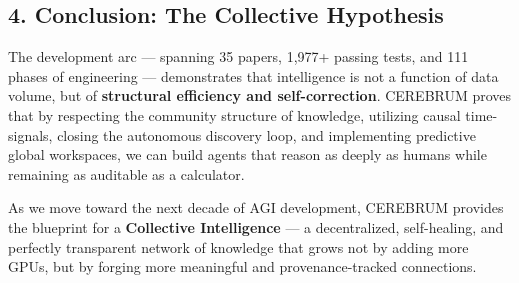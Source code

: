 \subsection*{4. Conclusion: The Collective Hypothesis}
The development arc --- spanning 35 papers, 1,977+ passing tests, and 111 phases of engineering --- demonstrates that intelligence is not a function of data volume, but of \textbf{structural efficiency and self-correction}. CEREBRUM proves that by respecting the community structure of knowledge, utilizing causal time-signals, closing the autonomous discovery loop, and implementing predictive global workspaces, we can build agents that reason as deeply as humans while remaining as auditable as a calculator.

As we move toward the next decade of AGI development, CEREBRUM provides the blueprint for a \textbf{Collective Intelligence} --- a decentralized, self-healing, and perfectly transparent network of knowledge that grows not by adding more GPUs, but by forging more meaningful and provenance-tracked connections.